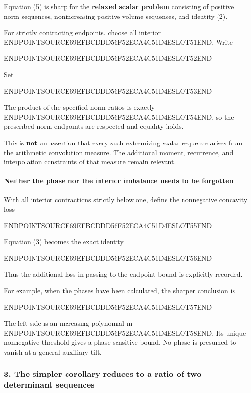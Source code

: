 Equation (5) is sharp for the \textbf{relaxed scalar problem} consisting of positive norm sequences, nonincreasing positive volume sequences, and identity (2).

For strictly contracting endpoints, choose all interior ENDPOINTSOURCE69EFBCDDD56F52ECA4C51D4ESLOT51END. Write

ENDPOINTSOURCE69EFBCDDD56F52ECA4C51D4ESLOT52END

Set

ENDPOINTSOURCE69EFBCDDD56F52ECA4C51D4ESLOT53END

The product of the specified norm ratios is exactly ENDPOINTSOURCE69EFBCDDD56F52ECA4C51D4ESLOT54END, so the prescribed norm endpoints are respected and equality holds.

This is \textbf{not} an assertion that every such extremizing scalar sequence arises from the arithmetic convolution measure. The additional moment, recurrence, and interpolation constraints of that measure remain relevant.

\paragraph{Neither the phase nor the interior imbalance needs to be forgotten}\label{endpoint-user_product_original--neither-the-phase-nor-the-interior-imbalance-needs-to-be-forgotten}

With all interior contractions strictly below one, define the nonnegative concavity loss

ENDPOINTSOURCE69EFBCDDD56F52ECA4C51D4ESLOT55END

Equation (3) becomes the exact identity

ENDPOINTSOURCE69EFBCDDD56F52ECA4C51D4ESLOT56END

Thus the additional loss in passing to the endpoint bound is explicitly recorded.

For example, when the phases have been calculated, the sharper conclusion is

ENDPOINTSOURCE69EFBCDDD56F52ECA4C51D4ESLOT57END

The left side is an increasing polynomial in ENDPOINTSOURCE69EFBCDDD56F52ECA4C51D4ESLOT58END. Its unique nonnegative threshold gives a phase-sensitive bound. No phase is presumed to vanish at a general auxiliary tilt.

\subsubsection{3. The simpler corollary reduces to a ratio of two determinant sequences}\label{endpoint-user_product_original--the-simpler-corollary-reduces-to-a-ratio-of-two-determinant-sequences}

